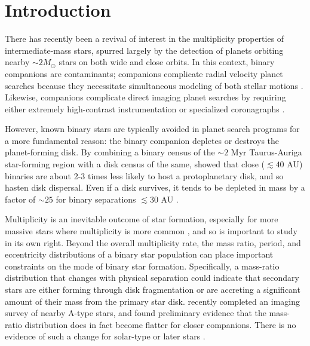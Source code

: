 \documentclass{emulateapj}
\begin{document}
\maketitle

\section{Introduction}


\label{sec:intro}
There has recently been a revival of interest in the multiplicity properties of intermediate-mass stars,  spurred largely by the detection of planets orbiting nearby \mbox{$\sim2 M_{\odot}$} stars on both wide \citep[e.g.][]{Lagrange2010, Marois2008} and close \citep{Johnson2011} orbits. In this context, binary companions are contaminants; companions complicate radial velocity planet searches because they necessitate simultaneous modeling of both stellar motions \citep[e.g.][]{Bergmann2015}. Likewise, companions complicate direct imaging planet searches by requiring either extremely high-contrast instrumentation \citep{Thalmann2014} or specialized coronagraphs \citep{Crepp2010}. 

However, known binary stars are typically avoided in planet search programs for a more fundamental reason: the binary companion depletes or destroys the planet-forming disk. By combining a binary census of the $\sim 2$ Myr Taurus-Auriga star-forming region with a disk census of the same, \cite{Kraus2012} showed that close ($\lesssim 40$ AU) binaries are about 2-3 times less likely to host a protoplanetary disk, and so hasten disk dispersal. Even if a disk survives, it tends to be depleted in mass by a factor of $\sim 25$ for binary separations $\lesssim 30$ AU \citep{Harris2012}.

Multiplicity is an inevitable outcome of star formation, especially for more massive stars where multiplicity is more common \citep{Zinnecker2007}, and so is important to study in its own right. Beyond the overall multiplicity rate, the mass ratio, period, and eccentricity distributions of a binary star population can place important constraints on the mode of binary star formation. Specifically, a mass-ratio distribution that changes with physical separation could indicate that secondary stars are either forming through disk fragmentation \citep[e.g.][]{Kratter2006, Stamatellos2011}  or are accreting a significant amount of their mass from the primary star disk. \cite{DeRosa2014} recently completed an imaging survey of nearby A-type stars, and found preliminary evidence that the mass-ratio distribution does in fact become flatter for closer companions. There is no evidence of such a change for solar-type or later stars \citep{Meyer2013}.
\end{document}
